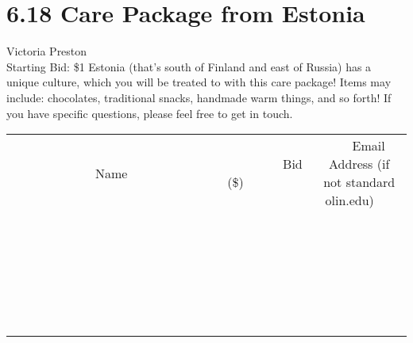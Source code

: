\documentclass[11pt]{article}
\begin{document}
\section*{6.18 Care Package from Estonia}
Victoria Preston
\\
Starting Bid: \$1
\newline
Estonia (that's south of Finland and east of Russia) has a unique culture, which you will be treated to with this care package! Items may include: chocolates, traditional snacks, handmade warm things, and so forth! If you have specific questions, please feel free to get in touch.
\\[6ex]
\begin{tabular}{c c c}
~~~~~~~~~~~~~Name~~~~~~~~~~~~~ & ~~~~~~~~~Bid (\$)~~~~~~~~~  & ~~~Email Address (if not standard olin.edu)~~~\\
 & & \\
\hline
 & & \\
\hline
 & & \\
\hline
 & & \\
\hline
 & & \\
\hline
 & & \\
\hline
 & & \\
\hline
 & & \\
\hline
 & & \\
\hline
 & & \\
\hline
 & & \\
\hline
 & & \\
\hline
 & & \\
\hline
 & & \\
\hline
 & & \\
\hline
 & & \\
\hline
 & & \\
\hline
 & & \\
\hline
 & & \\
\hline
 & & \\
\hline
 & & \\
\hline
 & & \\
\hline
 & & \\
\hline
 & & \\
\hline
 & & \\
\hline
 & & \\
\hline
\end{tabular}
\newpage
\end{document}
